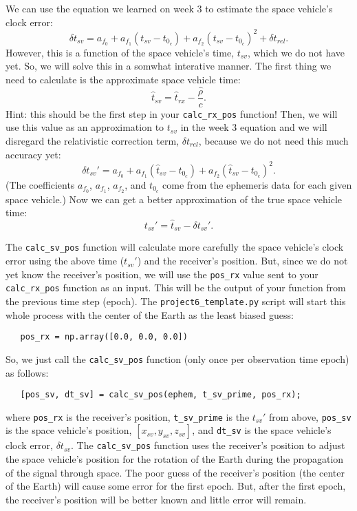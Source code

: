 \documentclass[12pt]{article}
\begin{document}
We can use the equation we learned on week 3 to estimate the space vehicle's
clock error:
\[ \delta t_{sv} = a_{f_0} + a_{f_1} \left( t_{sv} - t_{0_c} \right)
   + a_{f_2} \left( t_{sv} - t_{0_c} \right)^2 + \delta t_{rel} . \]
However, this is a function of the space vehicle's time, $t_{sv}$, which we do
not have yet.  So, we will solve this in a somwhat interative manner.  The first
thing we need to calculate is the approximate space vehicle time:
\[ \hat{t}_{sv} = \hat{t}_{rx} - \frac{\hat{\rho}}{c} . \]
Hint: this should be the first step in your \lstinline{calc_rx_pos} function!
Then, we will use this value as an approximation to $t_{sv}$ in the week 3
equation and we will disregard the relativistic correction term, $\delta
t_{rel}$, because we do not need this much accuracy yet:
\[ \delta t_{sv}' = a_{f_0} + a_{f_1} \left( \hat{t}_{sv} - t_{0_c} \right)
   + a_{f_2} \left( \hat{t}_{sv} - t_{0_c} \right)^2 . \]
(The coefficients $a_{f_0}$, $a_{f_1}$, $a_{f_2}$, and $t_{0_c}$ come from the
ephemeris data for each given space vehicle.)  Now we can get a better
approximation of the true space vehicle time:
\[ t_{sv}' = \hat{t}_{sv} - \delta t_{sv}' . \]

The \lstinline{calc_sv_pos} function will calculate more carefully the space
vehicle's clock error using the above time ($t_{sv}'$) and the receiver's
position.  But, since we do not yet know the receiver's position, we will use
the \lstinline{pos_rx} value sent to your \lstinline{calc_rx_pos} function as an
input.  This will be the output of your function from the previous time step
(epoch).  The \lstinline{project6_template.py} script will start this whole process with
the center of the Earth as the least biased guess:
\begin{lstlisting}
   pos_rx = np.array([0.0, 0.0, 0.0])
\end{lstlisting}
\noindent So, we just call the \lstinline{calc_sv_pos} function (only once per 
observation time epoch) as follows:
\begin{lstlisting}
   [pos_sv, dt_sv] = calc_sv_pos(ephem, t_sv_prime, pos_rx);
\end{lstlisting}
\noindent where \lstinline{pos_rx} is the receiver's position,
\lstinline{t_sv_prime} is the $t_{sv}'$ from above, \lstinline{pos_sv} is the
space vehicle's position, $[x_{sv}, y_{sv}, z_{sv}]$, and \lstinline{dt_sv} is
the space vehicle's clock error, $\delta t_{sv}$.  The \lstinline{calc_sv_pos}
function uses the receiver's position to adjust the space vehicle's position for
the rotation of the Earth during the propagation of the signal through space.
The poor guess of the receiver's position (the center of the Earth) will cause
some error for the first epoch.  But, after the first epoch, the receiver's
position will be better known and little error will remain.
\end{document}
